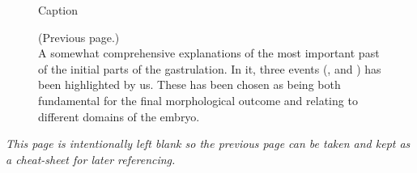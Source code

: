 \newpage

\begin{figure}[H]
    \centering
    \vspace*{-1cm}
    \caption{Caption}
    \label{fig:big-timeline}
\end{figure}
\newpage
\addtocounter{figure}{-1}
\begin{figure} [t!]
  \caption{(Previous page.) \\ A somewhat comprehensive explanations of the most important past of the initial parts of the gastrulation. In it, three events (,  and ) has been highlighted by us. These has been chosen as being both fundamental for the final morphological outcome and relating to different domains of the embryo.
  }
\end{figure}
\vspace*{5cm} 
\textit{This page is intentionally left blank so the previous page can be taken and kept as a cheat-sheet for later referencing. }
\newpage
